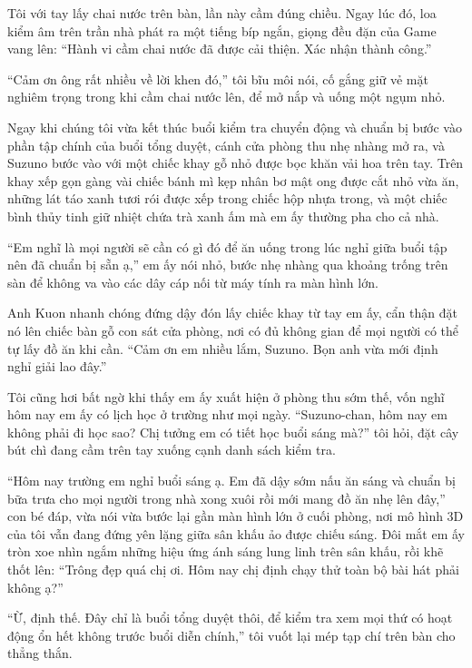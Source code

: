 ﻿\documentclass[../main.tex]{subfiles}
\begin{document}
Tôi với tay lấy chai nước trên bàn, lần này cầm đúng chiều. Ngay lúc đó, loa kiểm âm trên trần nhà phát ra một tiếng bíp ngắn, giọng đều đặn của Game vang lên: ``Hành vi cầm chai nước đã được cải thiện. Xác nhận thành công.''

``Cảm ơn ông rất nhiều về lời khen đó,'' tôi bĩu môi nói, cố gắng giữ vẻ mặt nghiêm trọng trong khi cầm chai nước lên, để mở nắp và uống một ngụm nhỏ.

\ct

Ngay khi chúng tôi vừa kết thúc buổi kiểm tra chuyển động và chuẩn bị bước vào phần tập chính của buổi tổng duyệt, cánh cửa phòng thu nhẹ nhàng mở ra, và Suzuno bước vào với một chiếc khay gỗ nhỏ được bọc khăn vải hoa trên tay. Trên khay xếp gọn gàng vài chiếc bánh mì kẹp nhân bơ mật ong được cắt nhỏ vừa ăn, những lát táo xanh tươi rói được xếp trong chiếc hộp nhựa trong, và một chiếc bình thủy tinh giữ nhiệt chứa trà xanh ấm mà em ấy thường pha cho cả nhà.

``Em nghĩ là mọi người sẽ cần có gì đó để ăn uống trong lúc nghỉ giữa buổi tập nên đã chuẩn bị sẵn ạ,'' em ấy nói nhỏ, bước nhẹ nhàng qua khoảng trống trên sàn để không va vào các dây cáp nối từ máy tính ra màn hình lớn.

Anh Kuon nhanh chóng đứng dậy đón lấy chiếc khay từ tay em ấy, cẩn thận đặt nó lên chiếc bàn gỗ con sát cửa phòng, nơi có đủ không gian để mọi người có thể tự lấy đồ ăn khi cần. ``Cảm ơn em nhiều lắm, Suzuno. Bọn anh vừa mới định nghỉ giải lao đây.''

Tôi cũng hơi bất ngờ khi thấy em ấy xuất hiện ở phòng thu sớm thế, vốn nghĩ hôm nay em ấy có lịch học ở trường như mọi ngày. ``Suzuno-chan, hôm nay em không phải đi học sao? Chị tưởng em có tiết học buổi sáng mà?'' tôi hỏi, đặt cây bút chì đang cầm trên tay xuống cạnh danh sách kiểm tra.

``Hôm nay trường em nghỉ buổi sáng ạ. Em đã dậy sớm nấu ăn sáng và chuẩn bị bữa trưa cho mọi người trong nhà xong xuôi rồi mới mang đồ ăn nhẹ lên đây,'' con bé đáp, vừa nói vừa bước lại gần màn hình lớn ở cuối phòng, nơi mô hình 3D của tôi vẫn đang đứng yên lặng giữa sân khấu ảo được chiếu sáng. Đôi mắt em ấy tròn xoe nhìn ngắm những hiệu ứng ánh sáng lung linh trên sân khấu, rồi khẽ thốt lên: ``Trông đẹp quá chị ơi. Hôm nay chị định chạy thử toàn bộ bài hát phải không ạ?''

``Ừ, định thế. Đây chỉ là buổi tổng duyệt thôi, để kiểm tra xem mọi thứ có hoạt động ổn hết không trước buổi diễn chính,'' tôi vuốt lại mép tạp chí trên bàn cho thẳng thắn.
\end{document}
